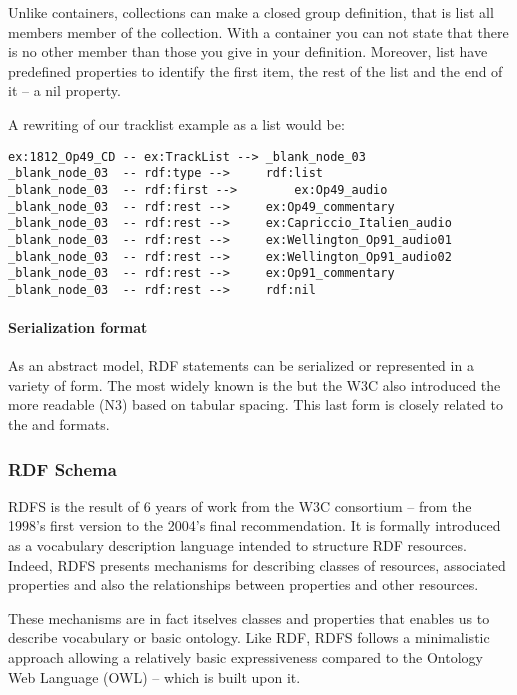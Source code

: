 Unlike containers, collections can make a closed group definition, that is list all members member of the collection. With a container you can not state that there  is no other member than those you give in your definition. 
Moreover, list have predefined properties to identify the first item, the rest of the list and the end of it – a nil property. 

A rewriting of our tracklist example as a list would be:
\begin{Verbatim}[fontsize=\small,formatcom=\color{black!70}]
ex:1812_Op49_CD	-- ex:TrackList -->	_blank_node_03
_blank_node_03	-- rdf:type -->		rdf:list
_blank_node_03	-- rdf:first -->		ex:Op49_audio
_blank_node_03	-- rdf:rest -->		ex:Op49_commentary
_blank_node_03	-- rdf:rest -->		ex:Capriccio_Italien_audio
_blank_node_03	-- rdf:rest -->		ex:Wellington_Op91_audio01
_blank_node_03	-- rdf:rest -->		ex:Wellington_Op91_audio02
_blank_node_03	-- rdf:rest -->		ex:Op91_commentary
_blank_node_03	-- rdf:rest -->		rdf:nil
\end{Verbatim}

\paragraph{Serialization format}
As an abstract model, RDF statements can be serialized or represented in a variety of form. The most widely known is the  but the W3C also introduced the more readable  (N3) based on tabular spacing. This last form is closely related to the  and  formats.





\subsubsection*{RDF Schema}
RDFS is the result of 6 years of work from the W3C consortium – from the 1998's first version to the 2004's final recommendation. 
It is formally introduced as a vocabulary description language intended to structure RDF resources. 
Indeed, RDFS presents mechanisms for describing classes of resources, associated properties and also the relationships between properties and other resources. 

These mechanisms are in fact itselves classes and properties that enables us to describe vocabulary or basic ontology. 
Like RDF, RDFS follows a minimalistic approach allowing a relatively basic expressiveness compared to the Ontology Web Language (OWL) – which is built upon it.

